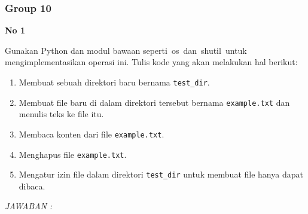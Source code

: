 \documentclass[12pt]{article}
\begin{document}
\subsubsection{Group 10}



\textbf{No 1}


    Gunakan Python dan modul bawaan seperti ⁠ os ⁠ dan ⁠ shutil ⁠ untuk mengimplementasikan operasi ini. Tulis kode yang akan melakukan hal berikut:
\begin{enumerate}
    \item Membuat sebuah direktori baru bernama \texttt{test\_dir}.
    \item Membuat file baru di dalam direktori tersebut bernama \texttt{example.txt} dan menulis teks ke file itu.
    \item Membaca konten dari file \texttt{example.txt}.
    \item Menghapus file \texttt{example.txt}.
    \item Mengatur izin file dalam direktori \texttt{test\_dir} untuk membuat file hanya dapat dibaca.
\end{enumerate}
\textit{JAWABAN :}
\end{document}
